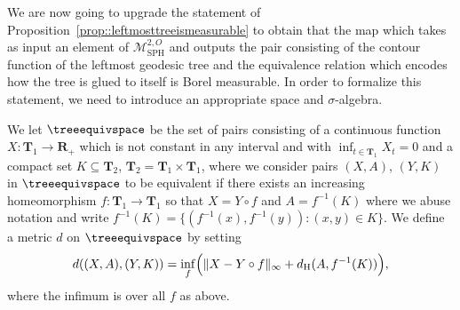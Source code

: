 \documentclass[JEP,XML,SOM,Unicode]{cedram}
\let\mathcal\mathscr
\theoremstyle{plain}
\numberwithin{theorem}{section}
\theoremstyle{definition}
\newcommand\gmsspace{{\mathcal M}_{\mathrm{SPH}}}
\newcommand{\R}{\mathbf{R}}
\newcommand{\T}{\mathbf{T}}
\renewcommand{\dh}{d_{\mathrm{H}}}
\begin{document}
We are now going to upgrade the statement of Proposition~\ref{prop::leftmosttreeismeasurable} to obtain that the map which takes as input an element of $\gmsspace^{2,O}$ and outputs the pair consisting of the contour function of the leftmost geodesic tree and the equivalence relation which encodes how the tree is glued to itself is Borel measurable. In order to formalize this statement, we need to introduce an appropriate space and $\sigma$-algebra.

We let $\treeequivspace$ be the set of pairs consisting of a continuous function $X \colon \T_1 \to \R_+$ which is not constant in any interval and with $\inf_{t \in \T_1} X_t = 0$ and a compact set $K \subseteq \T_2$, $\T_2 = \T_1 \times \T_1$, where we consider pairs $(X,A)$, $(Y,K)$ in $\treeequivspace$ to be equivalent if there exists an increasing homeomorphism $f \colon \T_1 \to \T_1$ so that $X = Y \circ f$ and $A = f^{-1}(K)$ where we abuse notation and write $f^{-1}(K) = \{(f^{-1}(x),f^{-1}(y)) : (x,y) \in K\}$. We define a metric $d$ on $\treeequivspace$ by setting
\[
d((X,A),(Y,K)) = \inf_f \Bigl( \| X - Y \circ f\|_\infty + \dh(A,f^{-1}(K)) \Bigr),
\]
where the infimum is over all $f$ as above.
\end{document}
